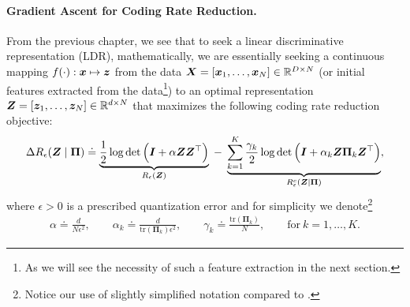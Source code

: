 \documentclass[../../book-main.tex]{subfiles}
\begin{document}
\paragraph{Gradient Ascent for Coding Rate Reduction.} From the previous chapter, we see that to seek a linear discriminative representation (LDR), mathematically, we are essentially seeking a continuous mapping $f(\cdot): \bm{x} \mapsto \bm{z}$ from the data $\bm{X} = [\bm{x}_1, \ldots, \bm{x}_N] \in \mathbb{R}^{D \times N}$ (or initial features extracted from the data\footnote{As we will see the necessity of such a feature extraction in the next section.}) to an optimal representation $\bm{Z} = [\bm{z}_1, \ldots, \bm{z}_N] \in \mathbb{R}^{d \times N}$ that maximizes the following coding rate reduction objective:
\begin{equation}\label{eq:mcr-formulation}
\begin{split}
\Delta R_{\epsilon}(\bm{Z} \mid \bm{\Pi}) \doteq \underbrace{\frac{1}{2}\log\det \Big(\bm{I} + {\alpha} \bm{Z} \bm{Z}^{\top} \Big)}_{R_{\epsilon}(\bm{Z})} \;-\; \underbrace{\sum_{k=1}^{K}\frac{\gamma_{k}}{2} \log\det\Big(\bm{I} + {\alpha_{k}} \bm{Z} \bm{\Pi}_{k} \bm{Z}^{\top} \Big)}_{R_{\epsilon}^c(\bm{Z} \mid \bm \Pi)},
\end{split}
\end{equation}
where $\epsilon > 0$ is a prescribed quantization error and for simplicity we denote\footnote{Notice our use of slightly simplified notation compared to .}
\begin{align*}
    \alpha \doteq \frac{d}{N\epsilon^2}, \qquad \alpha_{k} \doteq \frac{d}{\mathrm{tr}(\bm{\Pi}_{k})\epsilon^2}, \qquad \gamma_{k} \doteq \frac{\mathrm{tr}(\bm{\Pi}_{k})}{N}, \qquad \text{for}\ k = 1,\ldots, K.
\end{align*}
\end{document}
